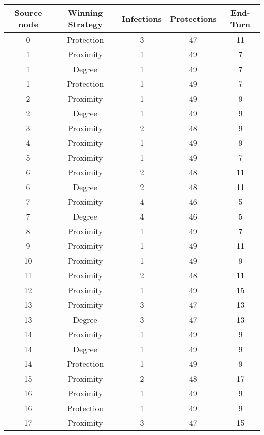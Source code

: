 \documentclass[results.tex]{subfiles}
\begin{document}
\begin{center}
  \begin{tabular}{| c || c | c | c | c |}
    \hline
    {\bfseries Source node} & {\bfseries Winning Strategy} & {\bfseries Infections} & {\bfseries Protections} & {\bfseries End-Turn} \\  %
    \hline\hline
    0 & Protection & 3 & 47 & 11 \\ 
    \hline
    1 & Proximity & 1 & 49 & 7 \\ 
    \hline
    1 & Degree & 1 & 49 & 7 \\ 
    \hline
    1 & Protection & 1 & 49 & 7 \\ 
    \hline
    2 & Proximity & 1 & 49 & 9 \\ 
    \hline
    2 & Degree & 1 & 49 & 9 \\ 
    \hline
    3 & Proximity & 2 & 48 & 9 \\ 
    \hline
    4 & Proximity & 1 & 49 & 9 \\ 
    \hline
    5 & Proximity & 1 & 49 & 7 \\ 
    \hline
    6 & Proximity & 2 & 48 & 11 \\ 
    \hline
    6 & Degree & 2 & 48 & 11 \\ 
    \hline
    7 & Proximity & 4 & 46 & 5 \\ 
    \hline
    7 & Degree & 4 & 46 & 5 \\ 
    \hline
    8 & Proximity & 1 & 49 & 7 \\ 
    \hline
    9 & Proximity & 1 & 49 & 11 \\ 
    \hline
    10 & Proximity & 1 & 49 & 9 \\ 
    \hline
    11 & Proximity & 2 & 48 & 11 \\ 
    \hline
    12 & Proximity & 1 & 49 & 15 \\ 
    \hline
    13 & Proximity & 3 & 47 & 13 \\ 
    \hline
    13 & Degree & 3 & 47 & 13 \\ 
    \hline
    14 & Proximity & 1 & 49 & 9 \\ 
    \hline
    14 & Degree & 1 & 49 & 9 \\ 
    \hline
    14 & Protection & 1 & 49 & 9 \\ 
    \hline
    15 & Proximity & 2 & 48 & 17 \\ 
    \hline
    16 & Proximity & 1 & 49 & 9 \\ 
    \hline
    16 & Protection & 1 & 49 & 9 \\ 
    \hline
    17 & Proximity & 3 & 47 & 15 \\ 

\end{tabular}
\end{center}
\end{document}
